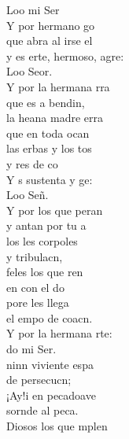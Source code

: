 \begin{cancion}
	Loo mi Ser\\
	Y por  hermano go\\
	que abra al irse el  \\
	y es erte, hermoso, agre:\\
	Loo Seor.\\
	\jump
	Y por la hermana rra\\
	que es a bendin,\\
	la heana madre erra\\
	que  en toda ocan\\
	las erbas y los tos \\
	y res de co \\
	Y s sustenta y ge: \\
	Loo Señ.\\
	\jump
	Y por los que peran\\
	y antan por tu a \\
	los les corpoles \\
	y  tribulacn,\\
	feles los que ren \\
	en  con el do \\
	pore les llega\\
	el empo de  coacn.\\
	\jump
	Y por la hermana rte:\\
	do mi Ser.\\
	ninn viviente espa \\
	de  persecucn;\\
	¡Ay!i en pecadoave\\
	sornde al peca.\\
	Diosos los que mplen \\

\end{cancion}
